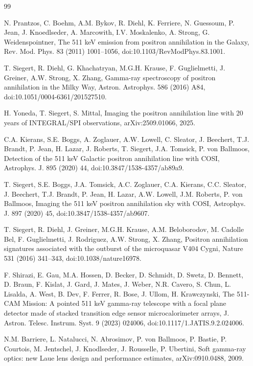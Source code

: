 \documentclass[preprint,12pt]{elsarticle}
\begin{document}
\begin{thebibliography}{99}

N. Prantzos, C. Boehm, A.M. Bykov, R. Diehl, K. Ferriere, N. Guessoum, P. Jean, J. Knoedlseder, A. Marcowith, I.V. Moskalenko, A. Strong, G. Weidenspointner, The 511 keV emission from positron annihilation in the Galaxy, Rev. Mod. Phys. 83 (2011) 1001--1056, doi:10.1103/RevModPhys.83.1001.

T. Siegert, R. Diehl, G. Khachatryan, M.G.H. Krause, F. Guglielmetti, J. Greiner, A.W. Strong, X. Zhang, Gamma-ray spectroscopy of positron annihilation in the Milky Way, Astron. Astrophys. 586 (2016) A84, doi:10.1051/0004-6361/201527510.

H. Yoneda, T. Siegert, S. Mittal, Imaging the positron annihilation line with 20 years of INTEGRAL/SPI observations, arXiv:2509.01066, 2025.

C.A. Kierans, S.E. Boggs, A. Zoglauer, A.W. Lowell, C. Sleator, J. Beechert, T.J. Brandt, P. Jean, H. Lazar, J. Roberts, T. Siegert, J.A. Tomsick, P. von Ballmoos, Detection of the 511 keV Galactic positron annihilation line with COSI, Astrophys. J. 895 (2020) 44, doi:10.3847/1538-4357/ab89a9.

T. Siegert, S.E. Boggs, J.A. Tomsick, A.C. Zoglauer, C.A. Kierans, C.C. Sleator, J. Beechert, T.J. Brandt, P. Jean, H. Lazar, A.W. Lowell, J.M. Roberts, P. von Ballmoos, Imaging the 511 keV positron annihilation sky with COSI, Astrophys. J. 897 (2020) 45, doi:10.3847/1538-4357/ab9607.

T. Siegert, R. Diehl, J. Greiner, M.G.H. Krause, A.M. Beloborodov, M. Cadolle Bel, F. Guglielmetti, J. Rodriguez, A.W. Strong, X. Zhang, Positron annihilation signatures associated with the outburst of the microquasar V404 Cygni, Nature 531 (2016) 341--343, doi:10.1038/nature16978.

F. Shirazi, E. Gau, M.A. Hossen, D. Becker, D. Schmidt, D. Swetz, D. Bennett, D. Braun, F. Kislat, J. Gard, J. Mates, J. Weber, N.R. Cavero, S. Chun, L. Lisalda, A. West, B. Dev, F. Ferrer, R. Bose, J. Ullom, H. Krawczynski, The 511-CAM Mission: A pointed 511 keV gamma-ray telescope with a focal plane detector made of stacked transition edge sensor microcalorimeter arrays, J. Astron. Telesc. Instrum. Syst. 9 (2023) 024006, doi:10.1117/1.JATIS.9.2.024006.

N.M. Barriere, L. Natalucci, N. Abrosimov, P. von Ballmoos, P. Bastie, P. Courtois, M. Jentschel, J. Knodlseder, J. Rousselle, P. Ubertini, Soft gamma-ray optics: new Laue lens design and performance estimates, arXiv:0910.0488, 2009.


\end{thebibliography}
\end{document}
